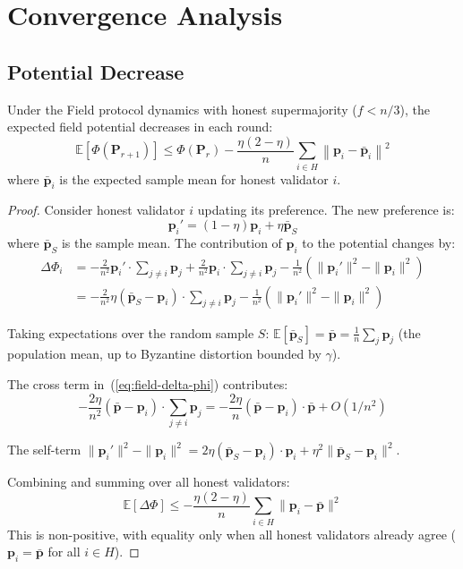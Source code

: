 \section{Convergence Analysis}

\label{sec:field-potential}

\subsection{Potential Decrease}

\begin{theorem}
\label{thm:field-potential}
Under the Field protocol dynamics with honest supermajority ($f < n/3$), the expected
field potential decreases in each round:
\[
\mathbb{E}[\Phi(\mathbf{P}_{r+1})] \leq \Phi(\mathbf{P}_r) - \frac{\eta(2-\eta)}{n} \sum_{i \in H} \left\| \mathbf{p}_i - \bar{\mathbf{p}}_i \right\|^2
\]
where $\bar{\mathbf{p}}_i$ is the expected sample mean for honest validator $i$.
\end{theorem}

\begin{proof}
Consider honest validator $i$ updating its preference. The new preference is:
\[
\mathbf{p}_i' = (1 - \eta)\mathbf{p}_i + \eta \bar{\mathbf{p}}_S
\]
where $\bar{\mathbf{p}}_S$ is the sample mean. The contribution of $\mathbf{p}_i$ to the
potential changes by:
\begin{align}
\Delta \Phi_i &= -\frac{2}{n^2} \mathbf{p}_i' \cdot \sum_{j \neq i} \mathbf{p}_j + \frac{2}{n^2} \mathbf{p}_i \cdot \sum_{j \neq i} \mathbf{p}_j - \frac{1}{n^2}(\|\mathbf{p}_i'\|^2 - \|\mathbf{p}_i\|^2) \nonumber \\
&= -\frac{2}{n^2} \eta(\bar{\mathbf{p}}_S - \mathbf{p}_i) \cdot \sum_{j \neq i} \mathbf{p}_j - \frac{1}{n^2}(\|\mathbf{p}_i'\|^2 - \|\mathbf{p}_i\|^2) \label{eq:field-delta-phi}
\end{align}

Taking expectations over the random sample $S$:
$\mathbb{E}[\bar{\mathbf{p}}_S] = \bar{\mathbf{p}} = \frac{1}{n}\sum_{j} \mathbf{p}_j$
(the population mean, up to Byzantine distortion bounded by $\gamma$).

The cross term in~(\ref{eq:field-delta-phi}) contributes:
\[
-\frac{2\eta}{n^2} (\bar{\mathbf{p}} - \mathbf{p}_i) \cdot \sum_{j \neq i} \mathbf{p}_j
= -\frac{2\eta}{n} (\bar{\mathbf{p}} - \mathbf{p}_i) \cdot \bar{\mathbf{p}} + O(1/n^2)
\]

The self-term $\|\mathbf{p}_i'\|^2 - \|\mathbf{p}_i\|^2 = 2\eta(\bar{\mathbf{p}}_S - \mathbf{p}_i) \cdot \mathbf{p}_i + \eta^2\|\bar{\mathbf{p}}_S - \mathbf{p}_i\|^2$.

Combining and summing over all honest validators:
\[
\mathbb{E}[\Delta \Phi] \leq -\frac{\eta(2-\eta)}{n} \sum_{i \in H} \|\mathbf{p}_i - \bar{\mathbf{p}}\|^2
\]
This is non-positive, with equality only when all honest validators already agree
($\mathbf{p}_i = \bar{\mathbf{p}}$ for all $i \in H$).
\end{proof}


